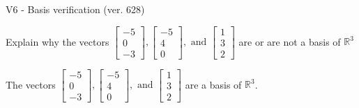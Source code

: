 \begin{exercise}
  \begin{exerciseTitle}V6 - Basis verification (ver. 628)\end{exerciseTitle}
  \begin{exerciseStatement}
    Explain why the vectors \(\left[\begin{array}{r}
-5 \\
0 \\
-3
\end{array}\right] , \left[\begin{array}{r}
-5 \\
4 \\
0
\end{array}\right] , \text{ and } \left[\begin{array}{r}
1 \\
3 \\
2
\end{array}\right]\) are or are not a basis of \(\mathbb{R}^3\)	


  \end{exerciseStatement}
  \begin{exerciseAnswer}
   The vectors \(\left[\begin{array}{r}
-5 \\
0 \\
-3
\end{array}\right] , \left[\begin{array}{r}
-5 \\
4 \\
0
\end{array}\right] , \text{ and } \left[\begin{array}{r}
1 \\
3 \\
2
\end{array}\right]\) 
  	 are  a basis of \(\mathbb{R}^3\).
  


  \end{exerciseAnswer}
\end{exercise}